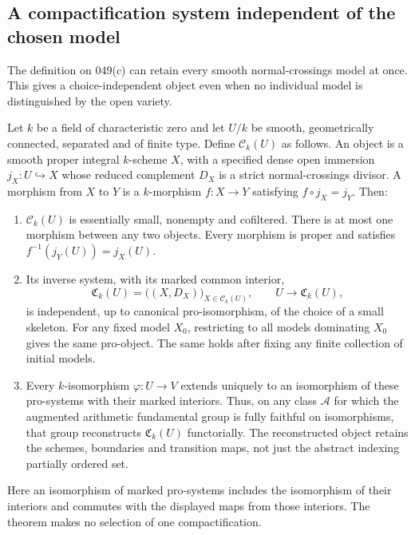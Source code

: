 \subsection{A compactification system independent of the chosen model}

The definition on 049(c) can retain every smooth normal-crossings model
at once. This gives a choice-independent object even when no individual
model is distinguished by the open variety.

\begin{theorem}
\label{A6-model-system}
Let $k$ be a field of characteristic zero and let $U/k$ be smooth,
geometrically connected, separated and of finite type. Define
$\mathcal C_k(U)$ as follows. An object is a smooth proper integral
$k$-scheme $X$, with a specified dense open immersion $j_X:U\hookrightarrow X$
whose reduced complement $D_X$ is a strict normal-crossings divisor.
A morphism from $X$ to $Y$ is a $k$-morphism $f:X\to Y$ satisfying
$f\circ j_X=j_Y$. Then:
\begin{enumerate}[label=(\roman*)]
\item $\mathcal C_k(U)$ is essentially small, nonempty and cofiltered.
There is at most one morphism between any two objects. Every morphism
is proper and satisfies $f^{-1}(j_Y(U))=j_X(U)$.
\item Its inverse system, with its marked common interior,
\[
 \mathfrak C_k(U)=\bigl((X,D_X)\bigr)_{X\in\mathcal C_k(U)},
 \qquad U\longrightarrow\mathfrak C_k(U),
\]
is independent, up to canonical pro-isomorphism, of the choice of a
small skeleton. For any fixed model $X_0$, restricting to all models
dominating $X_0$ gives the same pro-object. The same holds after fixing
any finite collection of initial models.
\item Every $k$-isomorphism $\varphi:U\to V$ extends uniquely to an
isomorphism of these pro-systems with their marked interiors. Thus,
on any class $\mathcal A$ for which the augmented arithmetic fundamental
group is fully faithful on isomorphisms, that group reconstructs
$\mathfrak C_k(U)$ functorially. The reconstructed object retains the
schemes, boundaries and transition maps, not just the abstract indexing
partially ordered set.
\end{enumerate}
Here an isomorphism of marked pro-systems includes the isomorphism of
their interiors and commutes with the displayed maps from those
interiors. The theorem makes no selection of one compactification.
\end{theorem}
